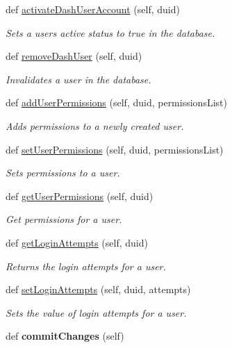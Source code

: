 \begin{DoxyCompactItemize}
def \hyperlink{classuser__dao_1_1_user_d_a_o_a34053c2fc6389dbb0f4aae859706c821}{activate\+Dash\+User\+Account} (self, duid)
\begin{DoxyCompactList}\small\item\em Sets a user\textquotesingle{}s active status to true in the database. \end{DoxyCompactList}\item 
def \hyperlink{classuser__dao_1_1_user_d_a_o_a65e39578f477f0040bb63b6961195369}{remove\+Dash\+User} (self, duid)
\begin{DoxyCompactList}\small\item\em Invalidates a user in the database. \end{DoxyCompactList}\item 
def \hyperlink{classuser__dao_1_1_user_d_a_o_a6143363df3a489c872150522172f9b43}{add\+User\+Permissions} (self, duid, permissions\+List)
\begin{DoxyCompactList}\small\item\em Adds permissions to a newly created user. \end{DoxyCompactList}\item 
def \hyperlink{classuser__dao_1_1_user_d_a_o_a6492941e2e4292a808bdcbfa9c450d20}{set\+User\+Permissions} (self, duid, permissions\+List)
\begin{DoxyCompactList}\small\item\em Sets permissions to a user. \end{DoxyCompactList}\item 
def \hyperlink{classuser__dao_1_1_user_d_a_o_a176984c2fe0442ebc4d0edd4371bdeee}{get\+User\+Permissions} (self, duid)
\begin{DoxyCompactList}\small\item\em Get permissions for a user. \end{DoxyCompactList}\item 
def \hyperlink{classuser__dao_1_1_user_d_a_o_abe0492f295d9bdc79d56026f9745723b}{get\+Login\+Attempts} (self, duid)
\begin{DoxyCompactList}\small\item\em Returns the login attempts for a user. \end{DoxyCompactList}\item 
def \hyperlink{classuser__dao_1_1_user_d_a_o_a7d79a2de0559bfaa08ff71e2b5695d3f}{set\+Login\+Attempts} (self, duid, attempts)
\begin{DoxyCompactList}\small\item\em Sets the value of login attempts for a user. \end{DoxyCompactList}\item 
\mbox{\label{classuser__dao_1_1_user_d_a_o_a5905177eaaf7657576f05d5e16ee8d80}} 
def {\bfseries commit\+Changes} (self)
\end{DoxyCompactItemize}
